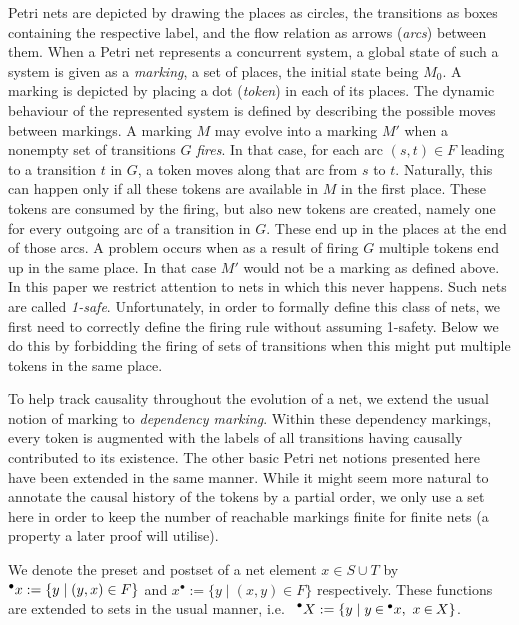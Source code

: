 \documentclass[submission,copyright,creativecommons]{eptcs}
\theoremstyle{definition}
\def\precond#1{{\vphantom{#1}}^\bullet #1}
\def\postcond#1{{#1}^\bullet}
\def\defitem#1{\emph{#1}}
\def\ie{i.e.\ }
\begin{document}
\noindent
Petri nets are depicted by drawing the places as circles, the
transitions as boxes containing the respective label, and the flow
relation as arrows (\defitem{arcs}) between them.
When a Petri net represents a concurrent system, a global state of such a system is
given as a \defitem{marking}, a set of places, the initial state being
$M_0$.  A marking is depicted by placing a dot (\defitem{token}) in
each of its places.  The dynamic behaviour of the represented system
is defined by describing the possible moves between markings. A
marking $M$ may evolve into a marking $M'$ when a nonempty set of transitions
$G$ \defitem{fires}. In that case, for each arc $(s,t) \in F$ leading
to a transition $t$ in $G$, a token moves along that arc from $s$ to
$t$.  Naturally, this can happen only if all these tokens are
available in $M$ in the first place. These tokens are consumed by the
firing, but also new tokens are created, namely one for every outgoing
arc of a transition in $G$. These end up in the places at the end of
those arcs.  A problem occurs when as a result of firing $G$ multiple
tokens end up in the same place. In that case $M'$ would not be
a marking as defined above. In this paper we restrict
attention to nets in which this never happens. Such nets are called
\defitem{1-safe}.  Unfortunately, in order to formally define this
class of nets, we first need to correctly define the firing rule
without assuming 1-safety. Below we do this by forbidding the firing
of sets of transitions when this might put multiple tokens in the same
place.

To help track causality throughout the evolution of a net, we extend the usual
notion of marking to \defitem{dependency marking}. Within these dependency
markings, every token is augmented with the labels of all transitions having
causally contributed to its existence.
The other basic Petri net notions
presented here have been extended in the same manner.
While it might seem more natural
to annotate the causal history of the tokens by a partial order, we only
use a set here in order to keep the number of reachable markings finite
for finite nets (a property a later proof will utilise).

We denote the preset and postset of a net element $x\in S\cup T$ by
$\precond{x} := \{y \mid (y, x) \in F\}$
and
$\postcond{x} := \{y \mid (x, y) \in F\}$
respectively.
These functions are extended to sets in the usual manner, \ie
$\precond{X} := \{y \mid y \inp \precond{x},~ x \inp X\}$.
\end{document}
